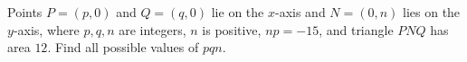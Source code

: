 Points $P=(p,0)$ and $Q=(q,0)$ lie on the $x$-axis and $N=(0,n)$ lies on the $y$-axis, where $p,q,n$ are integers, $n$ is positive, $np=-15$, and triangle $PNQ$ has area $12$. Find all possible values of $pqn$.
